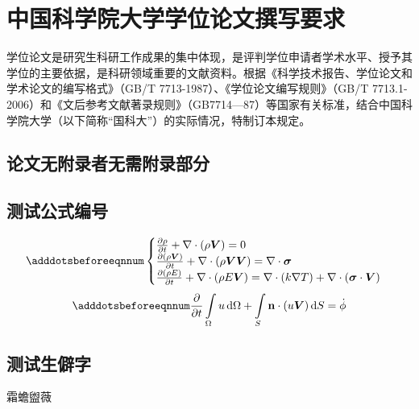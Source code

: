\chapter{中国科学院大学学位论文撰写要求}

学位论文是研究生科研工作成果的集中体现，是评判学位申请者学术水平、授予其学位的主要依据，是科研领域重要的文献资料。根据《科学技术报告、学位论文和学术论文的编写格式》（GB/T 7713-1987）、《学位论文编写规则》（GB/T 7713.1-2006）和《文后参考文献著录规则》（GB7714—87）等国家有关标准，结合中国科学院大学（以下简称“国科大”）的实际情况，特制订本规定。

\section{论文无附录者无需附录部分}

\section{测试公式编号} \label{sec:testmath}

\begin{equation} \label{eq:appedns}
    \adddotsbeforeeqnnum%
    \begin{cases}
        \frac{\partial \rho}{\partial t} + \nabla\cdot(\rho\Vector{V}) = 0\\
        \frac{\partial (\rho\Vector{V})}{\partial t} + \nabla\cdot(\rho\Vector{V}\Vector{V}) = \nabla\cdot\Tensor{\sigma}\\
        \frac{\partial (\rho E)}{\partial t} + \nabla\cdot(\rho E\Vector{V}) = \nabla\cdot(k\nabla T) + \nabla\cdot(\Tensor{\sigma}\cdot\Vector{V})
    \end{cases}
\end{equation}
\begin{equation}
    \adddotsbeforeeqnnum%
    \frac{\partial }{\partial t}\int\limits_{\Omega} u \, \mathrm{d}\Omega + \int\limits_{S} \unitVector{n}\cdot(u\Vector{V}) \, \mathrm{d}S = \dot{\phi}
\end{equation}

\section{测试生僻字}

霜蟾盥薇
